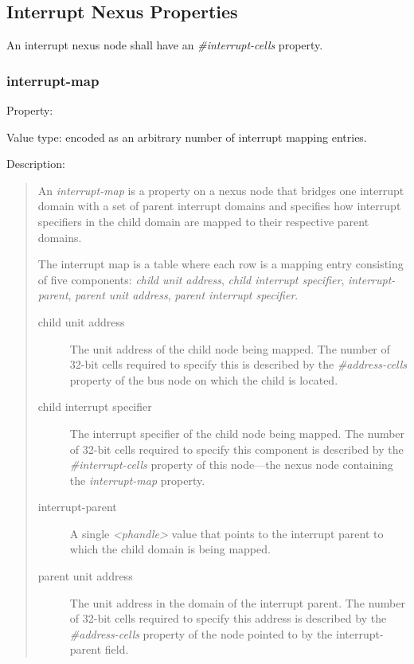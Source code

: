 \documentclass[a4paper,10pt,oneside]{sphinxmanual}
\begin{document}
\subsection{Interrupt Nexus Properties}
\label{devicetree-basics:interrupt-nexus-properties}
An interrupt nexus node shall have an \emph{\#interrupt-cells} property.


\subsubsection{interrupt-map}
\label{devicetree-basics:interrupt-map}
Property: 

Value type:  encoded as an arbitrary number of
interrupt mapping entries.

Description:
\begin{quote}

An \emph{interrupt-map} is a property on a nexus node that bridges one
interrupt domain with a set of parent interrupt domains and specifies
how interrupt specifiers in the child domain are mapped to their
respective parent domains.

The interrupt map is a table where each row is a mapping entry
consisting of five components: \emph{child unit address}, \emph{child interrupt
specifier}, \emph{interrupt-parent}, \emph{parent unit address}, \emph{parent interrupt
specifier}.
\begin{description}
\item[{child unit address}] \leavevmode
The unit address of the child node being mapped. The number of
32-bit cells required to specify this is described by the
\emph{\#address-cells} property of the bus node on which the child is
located.

\item[{child interrupt specifier}] \leavevmode
The interrupt specifier of the child node being mapped. The number
of 32-bit cells required to specify this component is described by
the \emph{\#interrupt-cells} property of this node—the nexus node
containing the \emph{interrupt-map} property.

\item[{interrupt-parent}] \leavevmode
A single \emph{\textless{}phandle\textgreater{}} value that points to the interrupt parent to
which the child domain is being mapped.

\item[{parent unit address}] \leavevmode
The unit address in the domain of the interrupt parent. The number
of 32-bit cells required to specify this address is described by the
\emph{\#address-cells} property of the node pointed to by the
interrupt-parent field.


\end{description}
\end{quote}
\end{document}
